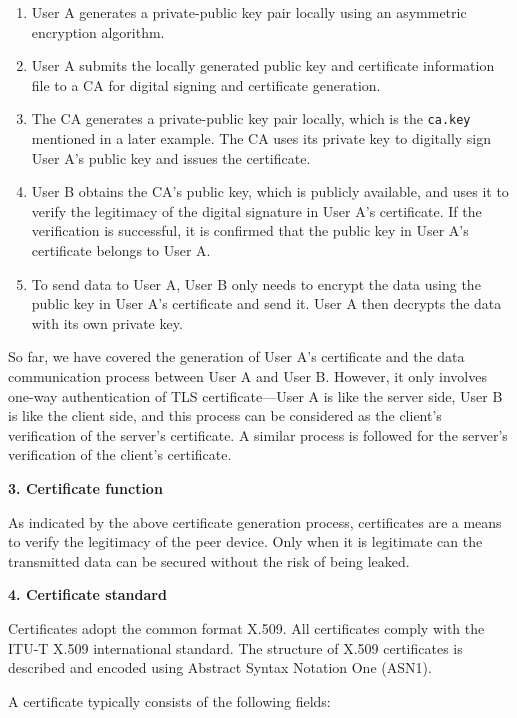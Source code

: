 \documentclass[a4paper,12pt,openany]{book}
\begin{document}
\begin{enumerate}[label=(\arabic*)]
    \item User A generates a private-public key pair locally using an asymmetric encryption algorithm.
    \item User A submits the locally generated public key and certificate information file to a CA for digital signing and certificate generation. 
    \item The CA generates a private-public key pair locally, which is the \verb|ca.key| mentioned in a later example. The CA uses its private key to digitally sign User A’s public key and issues the certificate.
    \item User B obtains the CA’s public key, which is publicly available, and uses it to verify the legitimacy of the digital signature in User A’s certificate. If the verification is successful, it is confirmed that the public key in User A’s certificate belongs to User A.
    \item To send data to User A, User B only needs to encrypt the data using the public key in User A’s certificate and send it. User A then decrypts the data with its own private key.
\end{enumerate}

So far, we have covered the generation of User A’s certificate and the data communication process between User A and User B. However, it only involves one-way authentication of TLS certificate—User A is like the server side, User B is like the client side, and this process can be considered as the client’s verification of the server’s certificate. A similar process is followed for the server’s verification of the client’s certificate.

\textbf{3.	Certificate function}

As indicated by the above certificate generation process, certificates are a means to verify the legitimacy of the peer device. Only when it is legitimate can the transmitted data can be secured without the risk of being leaked.

\textbf{4.	Certificate standard}

Certificates adopt the common format X.509. All certificates comply with the ITU-T X.509 international standard. The structure of X.509 certificates is described and encoded using Abstract Syntax Notation One (ASN1). 

A certificate typically consists of the following fields:
\end{document}
